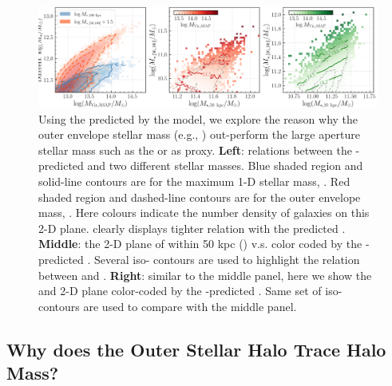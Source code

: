 \documentclass[fleqn,usenatbib,useAMS,english]{mnras}
\begin{document}
  \begin{figure}
      \centering
      \includegraphics[width=\textwidth]{figure/topn_fig_12}
      \caption{
          Using the \mvir{} predicted by the \asap{} model, we explore the reason why the outer
          envelope stellar mass (e.g., ) out-perform the large aperture stellar mass
          such as the  or \mmax{} as \mvir{} proxy.
          \textbf{Left}: relations between the \asap{}-predicted \mvir{} and two different stellar
          masses. Blue shaded region and solid-line contours are for the maximum 1-D stellar
          mass, \mmax{}. Red shaded region and dashed-line contours are for the outer envelope
          mass, . Here colours indicate the number density of galaxies on this 2-D plane.
          \menve{} clearly displays tighter relation with the predicted \mvir{}.
          \textbf{Middle}: the 2-D plane of \mstar{} within 50 kpc () v.s.
           color coded by the \asap{}-predicted \mvir{}.
          Several iso-\mvir{} contours are used to highlight the relation between \mvir{} and
          .
          \textbf{Right}: similar to the middle panel, here we show the \minn{} and 
          2-D plane color-coded by the \asap{}-predicted \mvir{}.
          Same set of iso-\mvir{} contours are used to compare with the middle panel.
      }
      \label{fig:outskirt_discussion}
  \end{figure}

\subsection{Why does the Outer Stellar Halo Trace Halo Mass?}
    \label{sec:outskirt_discussion}
    
\end{document}
